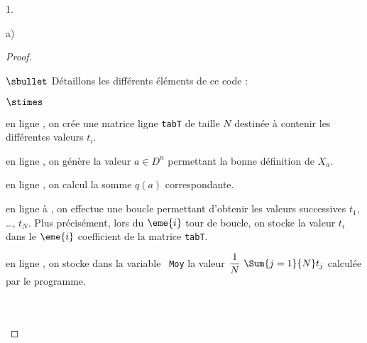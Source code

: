 \documentclass[11pt]{article}%
\begin{document}
\begin{noliste}{1.}
\begin{noliste}{a)}
\begin{proof}
\begin{noliste}{$\sbullet$}
        \noindent
        Détaillons les différents éléments de ce code :
        \begin{noliste}{$\stimes$}
        \item en ligne , on crée une matrice ligne {\tt tabT}
          de taille $N$ destinée à contenir les différentes valeurs
          $t_i$.
        \item en ligne , on génère la valeur $a \in D^n$
          permettant la bonne définition de $X_a$.
        \item en ligne , on calcul la somme $q(a)$
          correspondante.
        \item en ligne  à , on effectue une boucle
          permettant d'obtenir les valeurs successives $t_1$, \ldots,
          $t_N$. Plus précisément, lors du $\eme{i}$ tour de boucle,
          on stocke la valeur $t_i$ dans le $\eme{i}$ coefficient de
          la matrice {\tt tabT}.
        \item en ligne , on stocke dans la variable {\tt
            Moy} la valeur $\dfrac{1}{N} \ \Sum{j=1}{N} t_j$ calculée
          par le programme. 
        \end{noliste}
      \end{noliste}~\\[-.8cm]

      


      ~\\[-1.2cm]
    \end{proof}
  \end{noliste}
\end{noliste}%
\end{document}
